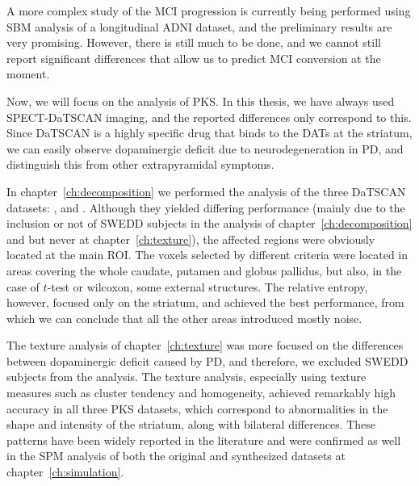 A more complex study of the \ac{MCI} progression is currently being performed using \ac{SBM} analysis of a longitudinal \ac{ADNI} dataset, and the preliminary results are very promising. However, there is still much to be done, and we cannot still report significant differences that allow us to predict \ac{MCI} conversion at the moment. 

Now, we will focus on the analysis of \ac{PKS}. In this thesis, we have always used \ac{SPECT}-DaTSCAN imaging, and the reported differences only correspond to this. Since DaTSCAN is a highly specific drug that binds to the \acp{DAT} at the striatum, we can easily observe dopaminergic deficit due to neurodegeneration in \ac{PD}, and distinguish this from other extrapyramidal symptoms. 

In chapter~\ref{ch:decomposition} we performed the analysis of the three DaTSCAN datasets: \ppmidat{}, \vdlndat{} and \vdlvdat{}. Although they yielded differing performance (mainly due to the inclusion or not of \ac{SWEDD} subjects in the analysis of chapter~\ref{ch:decomposition} and but never at chapter~\ref{ch:texture}), the affected regions were obviously located at the main \ac{ROI}. The voxels selected by different criteria were located in areas covering the whole caudate, putamen and globus pallidus, but also, in the case of $t$-test or wilcoxon, some external structures. The relative entropy, however, focused only on the striatum, and achieved the best performance, from which we can conclude that all the other areas introduced mostly noise.

The texture analysis of chapter~\ref{ch:texture} was more focused on the differences between dopaminergic deficit caused by \ac{PD}, and therefore, we excluded \ac{SWEDD} subjects from the analysis. The texture analysis, especially using texture measures such as cluster tendency and homogeneity, achieved remarkably high accuracy in all three \ac{PKS} datasets, which correspond to abnormalities in the shape and intensity of the striatum, along with bilateral differences. These patterns have been widely reported in the literature \cite{Towey2011,Illan2012,martinez2014parametrization} and were confirmed as well in the \ac{SPM} analysis of both the original and synthesized datasets at chapter~\ref{ch:simulation}. 

